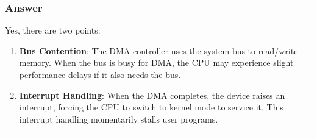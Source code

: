 \documentclass[12pt]{article}
\begin{document}
	\subsubsection*{Answer}
	Yes, there are two points:
	\begin{enumerate}
		\item \textbf{Bus Contention}: The DMA controller uses the system bus to read/write memory. When the bus is busy for DMA, the CPU may experience slight performance delays if it also needs the bus.
		\item \textbf{Interrupt Handling}: When the DMA completes, the device raises an interrupt, forcing the CPU to switch to kernel mode to service it. This interrupt handling momentarily stalls user programs.
	\end{enumerate}
	
	\hrule
	\vspace{0.5cm}
	
\end{document}
